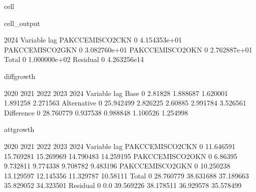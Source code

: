 \documentclass[letterpaper,10pt,english]{jupyterBook}
\begin{document}
\begin{sphinxuseclass}{cell}
\begin{sphinxVerbatimOutput}
\begin{sphinxuseclass}{cell_output}
\begin{sphinxVerbatim}[commandchars=\\\{\}]
                             2024  
Variable        lag                
PAKCCEMISCO2CKN 0    4.154353e+01  
PAKCCEMISCO2GKN 0    3.082760e+01  
PAKCCEMISCO2OKN 0    2.762887e+01  
Total           0    1.000000e+02  
Residual        0    4.263256e\PYGZhy{}14  
\end{sphinxVerbatim}

\begin{sphinxVerbatim}[commandchars=\\\{\}]
\PYGZsq{}diff\PYGZus{}growth\PYGZsq{}
\end{sphinxVerbatim}

\begin{sphinxVerbatim}[commandchars=\\\{\}]
                      2020      2021      2022      2023      2024
Variable    lag                                                   
Base        0      2.81828  1.888687  1.620001  1.891258  2.271563
Alternative 0   \PYGZhy{}25.942499  2.826225   2.60885  2.991784  3.526561
Difference  0   \PYGZhy{}28.760779  0.937538  0.988848  1.100526  1.254998
\end{sphinxVerbatim}

\begin{sphinxVerbatim}[commandchars=\\\{\}]
\PYGZsq{}att\PYGZus{}growth\PYGZsq{}
\end{sphinxVerbatim}

\begin{sphinxVerbatim}[commandchars=\\\{\}]
                          2020       2021       2022       2023       2024
Variable        lag                                                       
PAKCCEMISCO2CKN 0   \PYGZhy{}11.646591 \PYGZhy{}15.769281 \PYGZhy{}15.269969 \PYGZhy{}14.790483 \PYGZhy{}14.259195
PAKCCEMISCO2OKN 0     \PYGZhy{}6.86395  \PYGZhy{}9.732811  \PYGZhy{}9.774338  \PYGZhy{}9.708782  \PYGZhy{}9.483196
PAKCCEMISCO2GKN 0   \PYGZhy{}10.250238 \PYGZhy{}13.129597 \PYGZhy{}12.145356 \PYGZhy{}11.329787  \PYGZhy{}10.58111
Total           0   \PYGZhy{}28.760779 \PYGZhy{}38.631688 \PYGZhy{}37.189663 \PYGZhy{}35.829052 \PYGZhy{}34.323501
Residual        0          0.0 \PYGZhy{}39.569226 \PYGZhy{}38.178511 \PYGZhy{}36.929578 \PYGZhy{}35.578499
\end{sphinxVerbatim}

\end{sphinxuseclass}\end{sphinxVerbatimOutput}

\end{sphinxuseclass}
\end{document}

